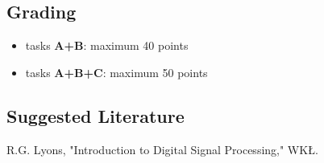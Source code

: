 \documentclass{article}
\begin{document}
\subsection*{Grading}
\begin{itemize}
    \item tasks \textbf{A+B}: maximum 40 points
    \item tasks \textbf{A+B+C}: maximum 50 points
\end{itemize}

\subsection*{Suggested Literature}
R.G. Lyons, "Introduction to Digital Signal Processing," WKŁ.
\end{document}
